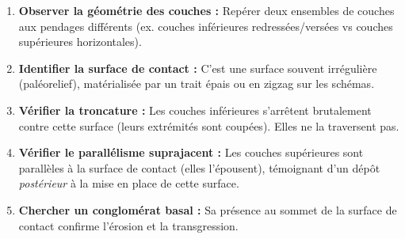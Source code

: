 \documentclass[11pt]{article}
\begin{document}
\begin{methode}
\begin{enumerate}
    \item \textbf{Observer la géométrie des couches :} Repérer deux ensembles de couches aux pendages différents (ex. couches inférieures redressées/versées vs couches supérieures horizontales).
    \item \textbf{Identifier la surface de contact :} C'est une surface souvent irrégulière (paléorelief), matérialisée par un trait épais ou en zigzag sur les schémas.
    \item \textbf{Vérifier la troncature :} Les couches inférieures s'arrêtent brutalement contre cette surface (leurs extrémités sont coupées). Elles ne la traversent pas.
    \item \textbf{Vérifier le parallélisme suprajacent :} Les couches supérieures sont parallèles à la surface de contact (elles l'épousent), témoignant d'un dépôt \emph{postérieur} à la mise en place de cette surface.
    \item \textbf{Chercher un conglomérat basal :} Sa présence au sommet de la surface de contact confirme l'érosion et la transgression.
\end{enumerate}
\end{methode}
\end{document}
